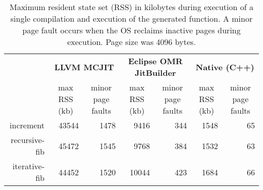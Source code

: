 \begin{table*}[t]
  \begin{tabular}{|r|l|l|l|l|l|l|}
  \hline
  
  \multicolumn{1}{|l|}{\multirow{2}{*}{}} 
  & \multicolumn{2}{c|}{\textbf{LLVM MCJIT}}                                                                                    
  & \multicolumn{2}{c|}{\textbf{Eclipse OMR JitBuilder}}                                                                
  & \multicolumn{2}{c|}{\textbf{Native (C++)}}                                                                              
  \\ \cline{2-7}
  
  \multicolumn{1}{|c|}{\textbf{Program}}  
  & \multicolumn{1}{c|}{max RSS (kb)}  %
  & \multicolumn{1}{c|}{minor page faults}  
  & \multicolumn{1}{c|}{max RSS (kb)}  %
  & \multicolumn{1}{c|}{minor page faults}  
  & \multicolumn{1}{c|}{max RSS (kb)}  %
  & \multicolumn{1}{c|}{minor page faults}  
  \\ \hline

  increment                               
  & \multicolumn{1}{r|}{\num{43544}} %
  & \multicolumn{1}{r|}{\num{1478}} 
  & \multicolumn{1}{r|}{\num{9416}} %
  & \multicolumn{1}{r|}{\num{344}}
  & \multicolumn{1}{r|}{\num{1548}}    %
  & \multicolumn{1}{r|}{\num{65}}
  \\ \hline
  
  recursive-fib                           
  & \multicolumn{1}{r|}{\num{45472}} %
  & \multicolumn{1}{r|}{\num{1545}} 
  & \multicolumn{1}{r|}{\num{9768}} %
  & \multicolumn{1}{r|}{\num{384}} 
  & \multicolumn{1}{r|}{\num{1532}}   %
  & \multicolumn{1}{r|}{\num{63}} 
  \\ \hline
  
  iterative-fib                           
  & \multicolumn{1}{r|}{\num{44452}} %
  & \multicolumn{1}{r|}{\num{1520}}
  & \multicolumn{1}{r|}{\num{10044}} %
  & \multicolumn{1}{r|}{\num{423}}
  & \multicolumn{1}{r|}{\num{1684}}   %
  & \multicolumn{1}{r|}{\num{66}}  
  \\ \hline
  
\end{tabular}
  \caption{Maximum resident state set (RSS) in kilobytes during execution of a single compilation and execution of the generated function. A minor page fault occurs when the OS reclaims inactive pages during execution. Page size was 4096 bytes.}
  \label{tab:max_rss}
\end{table*}

